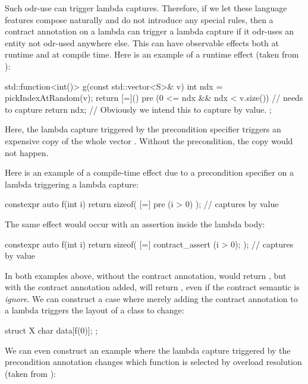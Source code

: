 Such odr-use can trigger lambda captures. Therefore, if we let these language features compose naturally and do not introduce any special rules, then a contract annotation on a lambda can trigger a lambda capture if it odr-uses an entity not odr-used anywhere else. This can have observable effects both at runtime and at compile time. Here is an example of a runtime effect (taken from \cite{P2932R2}):

\begin{codeblock}
std::function<int()> g(const std::vector<S>& v)
{
  int ndx = pickIndexAtRandom(v);
  return [=]()
    pre (0 <= ndx && ndx < v.size()) // needs to capture 
  {
    return ndx; // Obviously we intend this to capture  by value.
  }; 
}
\end{codeblock} 

Here, the lambda capture triggered by the precondition specifier triggers an expensive copy of the whole vector . Without the precondition, the copy would not happen. 

Here is an example of a compile-time effect due to a precondition specifier on a lambda triggering a lambda capture:

\begin{codeblock}
constexpr auto f(int i) {
  return sizeof( [=] pre (i > 0) {} );   // captures  by value
}
\end{codeblock}

The same effect would occur with an assertion inside the lambda body:

\begin{codeblock}
constexpr auto f(int i) {
  return sizeof( [=] { contract_assert (i > 0); } );   // captures  by value
}
\end{codeblock}

In both examples above, without the contract annotation,  would return , but with the contract annotation added,  will return , even if the contract semantic is \emph{ignore}. We can construct a case where merely adding the contract annotation to a lambda triggers the layout of a class to change:

\begin{codeblock}
struct X {
  char data[f(0)];
};
\end{codeblock}

We can even construct an example where the lambda capture triggered by the precondition annotation changes which function is selected by overload resolution (taken from \cite{P2932R2}):

